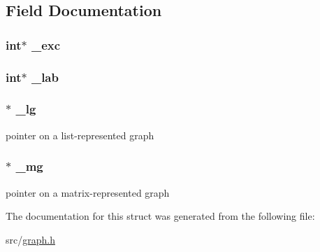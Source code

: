 \subsection{Field Documentation}
\hypertarget{struct_graph_a723723021a032fc4140eec215ab3cdde}{
\subsubsection[{\-\_\-exc}]{\setlength{\rightskip}{0pt plus 5cm}int$\ast$ {\bf \-\_\-exc}}}\label{struct_graph_a723723021a032fc4140eec215ab3cdde}
\hypertarget{struct_graph_a3d4aadf6e58d62691fef211a1d405507}{
\subsubsection[{\-\_\-lab}]{\setlength{\rightskip}{0pt plus 5cm}int$\ast$ {\bf \-\_\-lab}}}\label{struct_graph_a3d4aadf6e58d62691fef211a1d405507}
\hypertarget{struct_graph_a6e87444e20688d2c6b29018a1e19545a}{
\subsubsection[{\-\_\-lg}]{$\ast$ {\bf \-\_\-lg}}}\label{struct_graph_a6e87444e20688d2c6b29018a1e19545a}
pointer on a list-\/represented graph \hypertarget{struct_graph_a51971f3ef499f66e11de0883ac4634d4}{
\subsubsection[{\-\_\-mg}]{$\ast$ {\bf \-\_\-mg}}}\label{struct_graph_a51971f3ef499f66e11de0883ac4634d4}
pointer on a matrix-\/represented graph 

The documentation for this struct was generated from the following file\-:\begin{DoxyCompactItemize}
\item 
src/\hyperlink{graph_8h}{graph.\-h}\end{DoxyCompactItemize}
